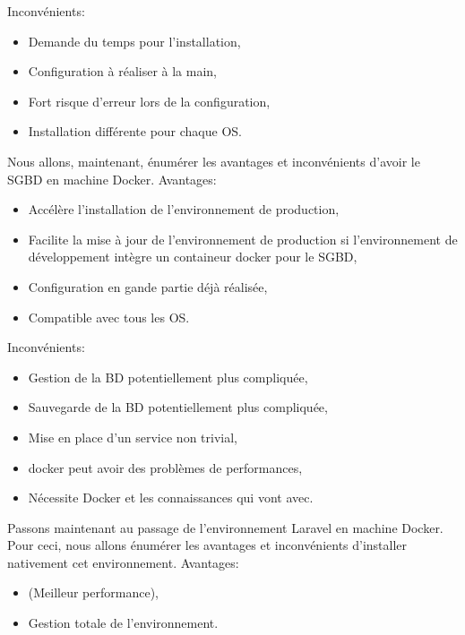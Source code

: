 \documentclass[
    iai, %
    il, %
]{heig-tb}
\begin{document}
Inconvénients:
\begin{itemize}
    \item Demande du temps pour l'installation,
    \item Configuration à réaliser à la main,
    \item Fort risque d'erreur lors de la configuration,
    \item Installation différente pour chaque OS.
\end{itemize}

Nous allons, maintenant, énumérer les avantages et inconvénients d'avoir le SGBD en machine Docker.
Avantages:
\begin{itemize}
    \item Accélère l'installation de l'environnement de production,
    \item Facilite la mise à jour de l'environnement de production si l'environnement de développement intègre un containeur docker pour le SGBD,
    \item Configuration en gande partie déjà réalisée,
    \item Compatible avec tous les OS.
\end{itemize}

Inconvénients:
\begin{itemize}
    \item Gestion de la BD potentiellement plus compliquée,
    \item Sauvegarde de la BD potentiellement plus compliquée,
    \item Mise en place d'un service non trivial,
    \item \Gls{docker} peut avoir des problèmes de performances, \cite{labrecque}
    \item Nécessite Docker et les connaissances qui vont avec. \cite{labrecque}
\end{itemize}

Passons maintenant au passage de l'environnement Laravel en machine Docker.
Pour ceci, nous allons énumérer les avantages et inconvénients d'installer nativement cet environnement.
Avantages:
\begin{itemize}
    \item (Meilleur performance),
    \item Gestion totale de l'environnement.
\end{itemize}
\end{document}

